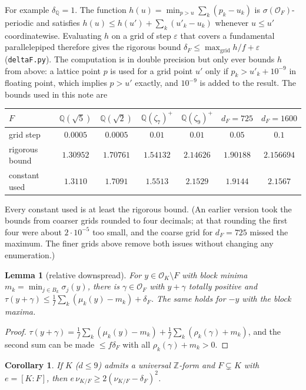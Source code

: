 \documentclass[11pt]{amsart}
\newtheorem{lemma}[theorem]{Lemma}
\newtheorem{corollary}[theorem]{Corollary}
\theoremstyle{definition}
\newcommand{\OK}{\mathcal{O}_K}
\newcommand{\OF}{\mathcal{O}_F}
\newcommand{\Q}{\mathbb{Q}}
\newcommand{\Z}{\mathbb{Z}}
\newcommand{\nurel}{\nu_{K/F}}
\newcommand{\file}[1]{\texttt{#1}}
\begin{document}
For example $\delta_\Q=1$.  The function $h(u)=\min_{p>u}\sum_k(p_k-u_k)$ is
$\sigma(\OF)$-periodic and satisfies $h(u)\le h(u')+\sum_k(u'_k-u_k)$ whenever $u\le u'$
coordinatewise.  Evaluating $h$ on a grid of step $\varepsilon$ that covers a fundamental
parallelepiped therefore gives the rigorous bound $\delta_F\le\max_{\mathrm{grid}}h/f+\varepsilon$
(\file{deltaF.py}).  The computation is in double precision but only ever bounds $h$ from
above: a lattice point $p$ is used for a grid point $u'$ only if $p_k>u'_k+10^{-9}$ in floating
point, which implies $p>u'$ exactly, and $10^{-9}$ is added to the result.  The bounds used in
this note are
\begin{center}
\begin{tabular}{lcccccc}
\toprule
$F$ & $\Q(\sqrt5)$ & $\Q(\sqrt2)$ & $\Q(\zeta_7)^+$ & $\Q(\zeta_9)^+$ & $d_F=725$ & $d_F=1600$\\
\midrule
grid step & $0.0005$ & $0.0005$ & $0.01$ & $0.01$ & $0.05$ & $0.1$\\
rigorous bound & $1.30952$ & $1.70761$ & $1.54132$ & $2.14626$ & $1.90188$ & $2.156694$\\
constant used & $1.3110$ & $1.7091$ & $1.5513$ & $2.1529$ & $1.9144$ & $2.1567$\\
\bottomrule
\end{tabular}
\end{center}
Every constant used is at least the rigorous bound.  (An earlier version took the bounds from
coarser grids rounded to four decimals; at that rounding the first four were about
$2\cdot10^{-5}$ too small, and the coarse grid for $d_F=725$ missed the maximum.  The finer
grids above remove both issues without changing any enumeration.)

\begin{lemma}[relative downspread]\label{lem:reldown}
For $y\in\OK\setminus F$ with block minima $m_k=\min_{j\in B_k}\sigma_j(y)$, there is
$\gamma\in\OF$ with $y+\gamma$ totally positive and
$\tau(y+\gamma)\le\frac1f\sum_k(\mu_k(y)-m_k)+\delta_F$.  The same holds for $-y$ with the
block maxima.
\end{lemma}

\begin{proof}
$\tau(y+\gamma)=\frac1f\sum_k(\mu_k(y)-m_k)+\frac1f\sum_k(\rho_k(\gamma)+m_k)$, and the second
sum can be made $\le f\delta_F$ with all $\rho_k(\gamma)+m_k>0$.
\end{proof}

\begin{corollary}\label{cor:relbound}
If $K$ ($d\le9$) admits a universal $\Z$-form and $F\subsetneq K$ with $e=[K:F]$, then
$e\,\nurel\ge2(\nurel-\delta_F)^2$.
\end{corollary}
\end{document}
